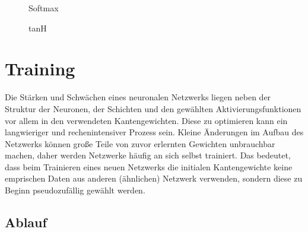 \begin{figure}[H]
    \begin{minipage}{0.45\textwidth}
        \begin{center}
        \end{center}
        \caption{Softmax}
    \end{minipage}\hfill
    \begin{minipage}{0.45\textwidth}
        \begin{center}
        \end{center}
        \caption{tanH}
    \end{minipage}
\end{figure}

\section{Training}\label{sec:training}

Die Stärken und Schwächen eines neuronalen Netzwerks liegen neben der
Struktur der Neuronen, der Schichten und den gewählten Aktivierungsfunktionen
vor allem in den verwendeten Kantengewichten. Diese zu optimieren kann ein
langwieriger und rechenintensiver Prozess sein. Kleine Änderungen im Aufbau
des Netzwerks können große Teile von zuvor erlernten Gewichten unbrauchbar
machen, daher werden Netzwerke häufig an sich selbst trainiert.
Das bedeutet, dass beim Trainieren eines neuen Netzwerks die initialen
Kantengewichte keine emprischen Daten aus anderen (ähnlichen) Netzwerk verwenden,
sondern diese zu Beginn pseudozufällig gewählt werden.

\subsection{Ablauf}

